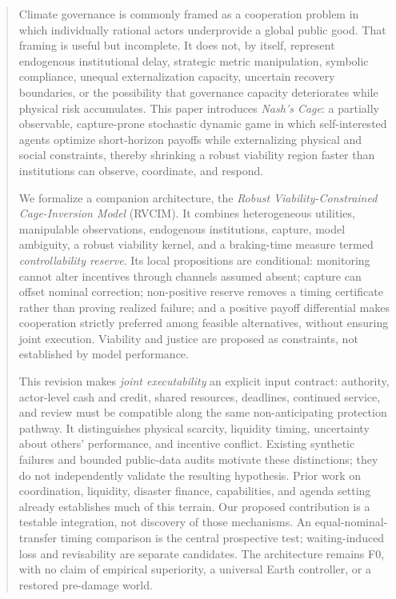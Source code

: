\documentclass[11pt,a4paper]{article}
\numberwithin{equation}{section}
\theoremstyle{definition}
\theoremstyle{plain}
\theoremstyle{remark}
\newcommand{\RVCIM}{\textsc{RVCIM}}
\begin{document}
\begin{abstract}
Climate governance is commonly framed as a cooperation problem in which individually rational actors underprovide a global public good. That framing is useful but incomplete. It does not, by itself, represent endogenous institutional delay, strategic metric manipulation, symbolic compliance, unequal externalization capacity, uncertain recovery boundaries, or the possibility that governance capacity deteriorates while physical risk accumulates. This paper introduces \emph{Nash's Cage}: a partially observable, capture-prone stochastic dynamic game in which self-interested agents optimize short-horizon payoffs while externalizing physical and social constraints, thereby shrinking a robust viability region faster than institutions can observe, coordinate, and respond.

We formalize a companion architecture, the \emph{Robust Viability-Constrained Cage-Inversion Model} (\RVCIM). It combines heterogeneous utilities, manipulable observations, endogenous institutions, capture, model ambiguity, a robust viability kernel, and a braking-time measure termed \emph{controllability reserve}. Its local propositions are conditional: monitoring cannot alter incentives through channels assumed absent; capture can offset nominal correction; non-positive reserve removes a timing certificate rather than proving realized failure; and a positive payoff differential makes cooperation strictly preferred among feasible alternatives, without ensuring joint execution. Viability and justice are proposed as constraints, not established by model performance.

This revision makes \emph{joint executability} an explicit input contract: authority, actor-level cash and credit, shared resources, deadlines, continued service, and review must be compatible along the same non-anticipating protection pathway. It distinguishes physical scarcity, liquidity timing, uncertainty about others' performance, and incentive conflict. Existing synthetic failures and bounded public-data audits motivate these distinctions; they do not independently validate the resulting hypothesis. Prior work on coordination, liquidity, disaster finance, capabilities, and agenda setting already establishes much of this terrain. Our proposed contribution is a testable integration, not discovery of those mechanisms. An equal-nominal-transfer timing comparison is the central prospective test; waiting-induced loss and revisability are separate candidates. The architecture remains F0, with no claim of empirical superiority, a universal Earth controller, or a restored pre-damage world.
\end{abstract}
\end{document}
